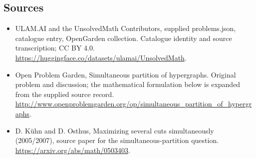 \documentclass[11pt,a4paper]{article}
\begin{document}
\subsection{Sources}
\begin{itemize}
\item[S1] ULAM.AI and the UnsolvedMath Contributors, supplied problems.json, catalogue entry, OpenGarden collection. Catalogue identity and source transcription; CC BY 4.0.
\url{https://huggingface.co/datasets/ulamai/UnsolvedMath}.
\item[S2] Open Problem Garden, Simultaneous partition of hypergraphs. Original problem and discussion; the mathematical formulation below is expanded from the supplied source record.
\url{http://www.openproblemgarden.org/op/simultaneous_partition_of_hypergraphs}.
\item[S3] D. Kühn and D. Osthus, Maximizing several cuts simultaneously (2005/2007), source paper for the simultaneous-partition question.
\url{https://arxiv.org/abs/math/0503403}.
\end{itemize}
\end{document}
